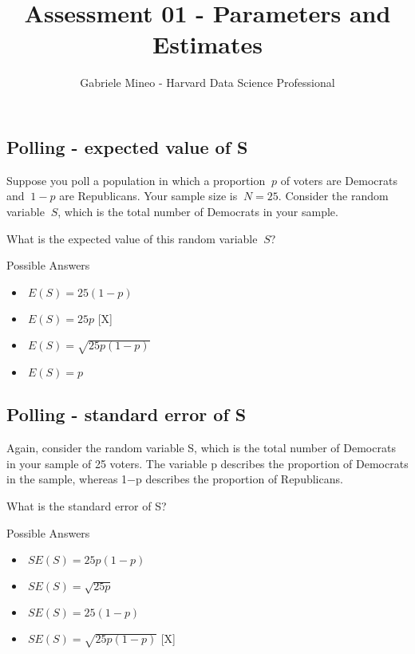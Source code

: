\documentclass[]{article}
\title{Assessment 01 - Parameters and Estimates}
\author{Gabriele Mineo - Harvard Data Science Professional}
\date{}
\providecommand{\tightlist}{%
  \setlength{\itemsep}{0pt}\setlength{\parskip}{0pt}}
\begin{document}
\maketitle

\subsection{\texorpdfstring{\textbf{Polling - expected value of
S}}{Polling - expected value of S}}\label{polling---expected-value-of-s}

Suppose you poll a population in which a proportion \(\ p\) of voters
are Democrats and \(\ 1−p\) are Republicans. Your sample size is
\(\ N=25\). Consider the random variable \(\ S\), which is the total
number of Democrats in your sample.

What is the expected value of this random variable \(\ S\)?

Possible Answers

\begin{itemize}
\tightlist
\item
  \(\ E(S)=25(1−p)\)
\item
  \(\ E(S)=25p\) {[}X{]}
\item
  \(\ E(S)=\sqrt{25 p (1-p)}\)
\item
  \(\ E(S)=p\)
\end{itemize}

\subsection{\texorpdfstring{\textbf{Polling - standard error of
S}}{Polling - standard error of S}}\label{polling---standard-error-of-s}

Again, consider the random variable S, which is the total number of
Democrats in your sample of 25 voters. The variable p describes the
proportion of Democrats in the sample, whereas 1−p describes the
proportion of Republicans.

What is the standard error of S?

Possible Answers

\begin{itemize}
\tightlist
\item
  \(\ SE(S)=25p(1−p)\)
\item
  \(\ SE(S)=\sqrt{25p}\)
\item
  \(\ SE(S)=25(1−p)\)
\item
  \(\ SE(S)=\sqrt{25 p (1-p)}\) {[}X{]}
\end{itemize}
\end{document}
